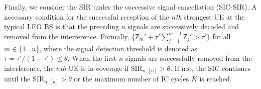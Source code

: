 \documentclass[lettersize,journal]{IEEEtran}
\begin{document}

Finally, we consider the SIR under the successive signal cancellation (SIC-SIR). A necessary condition for the successful reception of the $n$\textit{th} strongest UE at the typical LEO BS is that the preceding $n$ signals are successively decoded and removed from the interference. Formally, $\{\mathsf{Z}_m'+\tau'\sum_{j=1}^{m-1}\mathsf{Z}_j'>\tau'\}$ for all $m \in \{1 \dots n\}$, where the signal detection threshold is denoted as $ \tau = \tau'/(1-\tau') \leq \theta$. When the first $n$ signals are successfully removed from the interference, the $n$\textit{th} UE is in coverage if SIR$_{n,[n]}>\theta$. If not, the SIC continues until the SIR$_{n,[k]}>\theta$ or the maximum number of IC cycles $K$ is reached. %
\end{document}
